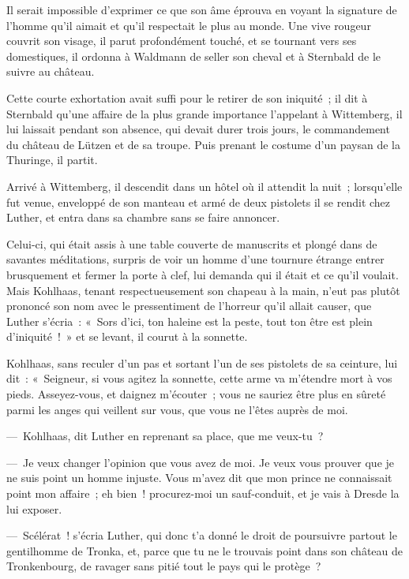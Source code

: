 \documentclass[french,twoside]{book} %
\begin{document}
Il serait impossible d’exprimer ce que son âme éprouva en voyant la signature de l’homme qu’il aimait et qu’il respectait le plus au monde. Une vive rougeur couvrit son visage, il parut profondément touché, et se tournant vers ses domestiques, il ordonna à Waldmann de seller son cheval et à Sternbald de le suivre au château.\par
Cette courte exhortation avait suffi pour le retirer de son iniquité ; il dit à Sternbald qu’une affaire de la plus grande importance l’appelant à Wittemberg, il lui laissait pendant son absence, qui devait durer trois jours, le commandement du château de Lützen et de sa troupe. Puis prenant le costume d’un paysan de la Thuringe, il partit.\par
Arrivé à Wittemberg, il descendit dans un hôtel où il attendit la nuit ; lorsqu’elle fut venue, enveloppé de son manteau et armé de deux pistolets il se rendit chez Luther, et entra dans sa chambre sans se faire annoncer.\par
Celui-ci, qui était assis à une table couverte de manuscrits et plongé dans de savantes méditations, surpris de voir un homme d’une tournure étrange entrer brusquement et fermer la porte à clef, lui demanda qui il était et ce qu’il voulait. Mais Kohlhaas, tenant respectueusement son chapeau à la main, n’eut pas plutôt prononcé son nom avec le pressentiment de l’horreur qu’il allait causer, que Luther s’écria : « Sors d’ici, ton haleine est la peste, tout ton être est plein d’iniquité ! » et se levant, il courut à la sonnette.\par
Kohlhaas, sans reculer d’un pas et sortant l’un de ses pistolets de sa ceinture, lui dit : « Seigneur, si vous agitez la sonnette, cette arme va m’étendre mort à vos pieds. Asseyez-vous, et daignez m’écouter ; vous ne sauriez être plus en sûreté parmi les anges qui veillent sur vous, que vous ne l’êtes auprès de moi.\par
— Kohlhaas, dit Luther en reprenant sa place, que me veux-tu ?\par
— Je veux changer l’opinion que vous avez de moi. Je veux vous prouver que je ne suis point un homme injuste. Vous m’avez dit que mon prince ne connaissait point mon affaire ; eh bien ! procurez-moi un sauf-conduit, et je vais à Dresde la lui exposer.\par
— Scélérat ! s’écria Luther, qui donc t’a donné le droit de poursuivre partout le gentilhomme de Tronka, et, parce que tu ne le trouvais point dans son château de Tronkenbourg, de ravager sans pitié tout le pays qui le protège ?\par
\end{document}
